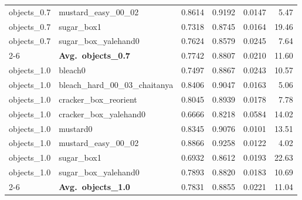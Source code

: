 \begin{longtable}{llrrrr}
  objects_0.7 & mustard\_easy\_00\_02 & 0.8614 & 0.9192 & 0.0147 & 5.47 \\
  objects_0.7 & sugar\_box1 & 0.7318 & 0.8745 & 0.0164 & 19.46 \\
  objects_0.7 & sugar\_box\_yalehand0 & 0.7624 & 0.8579 & 0.0245 & 7.64 \\
  \cmidrule{2-6}
  & \textbf{Avg.~objects_0.7} & 0.7742 & 0.8807 & 0.0210 & 11.60 \\
  \midrule
  objects_1.0 & bleach0 & 0.7497 & 0.8867 & 0.0243 & 10.57 \\
  objects_1.0 & bleach\_hard\_00\_03\_chaitanya & 0.8406 & 0.9047 & 0.0163 & 5.06 \\
  objects_1.0 & cracker\_box\_reorient & 0.8045 & 0.8939 & 0.0178 & 7.78 \\
  objects_1.0 & cracker\_box\_yalehand0 & 0.6666 & 0.8218 & 0.0584 & 14.02 \\
  objects_1.0 & mustard0 & 0.8345 & 0.9076 & 0.0101 & 13.51 \\
  objects_1.0 & mustard\_easy\_00\_02 & 0.8866 & 0.9258 & 0.0122 & 4.02 \\
  objects_1.0 & sugar\_box1 & 0.6932 & 0.8612 & 0.0193 & 22.63 \\
  objects_1.0 & sugar\_box\_yalehand0 & 0.7893 & 0.8820 & 0.0183 & 10.69 \\
  \cmidrule{2-6}
  & \textbf{Avg.~objects_1.0} & 0.7831 & 0.8855 & 0.0221 & 11.04 \\
  \midrule
\bottomrule
\end{longtable}